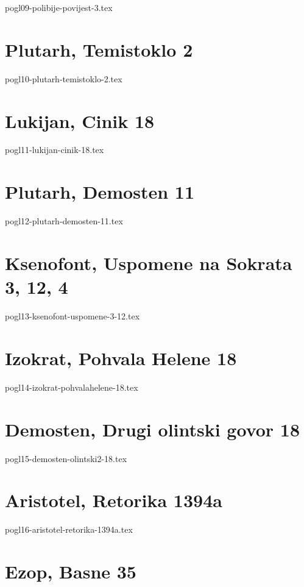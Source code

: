 \documentclass[a4paper,12pt,twoside]{report}
\begin{document}
{pogl09-polibije-povijest-3.tex}

\chapter{Plutarh, Temistoklo 2}

{pogl10-plutarh-temistoklo-2.tex}

\chapter{Lukijan, Cinik 18}

{pogl11-lukijan-cinik-18.tex}

\chapter{Plutarh, Demosten 11}

{pogl12-plutarh-demosten-11.tex}

\chapter{Ksenofont, Uspomene na Sokrata 3, 12, 4}

{pogl13-ksenofont-uspomene-3-12.tex}

\chapter{Izokrat, Pohvala Helene 18}

{pogl14-izokrat-pohvalahelene-18.tex}

\chapter{Demosten, Drugi olintski govor 18}

{pogl15-demosten-olintski2-18.tex}

\chapter{Aristotel, Retorika 1394a}

{pogl16-aristotel-retorika-1394a.tex}

\chapter{Ezop, Basne 35}
\end{document}
